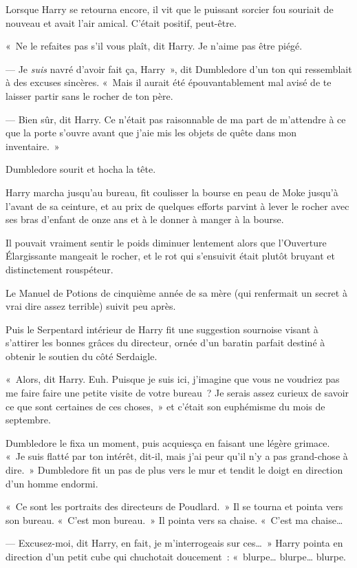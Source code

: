 Lorsque Harry se retourna encore, il vit que le puissant sorcier fou souriait de nouveau et avait l'air amical.
C'était positif, peut-être.

«~Ne le refaites pas s'il vous plaît, dit Harry.
Je n'aime pas être piégé.

--- Je \emph{suis} navré d'avoir fait ça, Harry~», dit Dumbledore d'un ton qui ressemblait à des excuses sincères.
«~Mais il aurait été épouvantablement mal avisé de te laisser partir sans le rocher de ton père.

--- Bien sûr, dit Harry.
Ce n'était pas raisonnable de ma part de m'attendre à ce que la porte s'ouvre avant que j'aie mis les objets de quête dans mon inventaire.~»

Dumbledore sourit et hocha la tête.

Harry marcha jusqu'au bureau, fit coulisser la bourse en peau de Moke jusqu'à l'avant de sa ceinture, et au prix de quelques efforts parvint à lever le rocher avec ses bras d'enfant de onze ans et à le donner à manger à la bourse.

Il pouvait vraiment sentir le poids diminuer lentement alors que l'Ouverture Élargissante mangeait le rocher, et le rot qui s'ensuivit était plutôt bruyant et distinctement rouspéteur.

Le Manuel de Potions de cinquième année de sa mère (qui renfermait un secret à vrai dire assez terrible) suivit peu après.

Puis le Serpentard intérieur de Harry fit une suggestion sournoise visant à s'attirer les bonnes grâces du directeur, ornée d'un baratin parfait destiné à obtenir le soutien du côté Serdaigle.

«~Alors, dit Harry.
Euh. Puisque je suis ici, j'imagine que vous ne voudriez pas me faire faire une petite visite de votre bureau~?
Je serais assez curieux de savoir ce que sont certaines de ces choses,~» et c'était son euphémisme du mois de septembre.

Dumbledore le fixa un moment, puis acquiesça en faisant une légère grimace.
«~Je suis flatté par ton intérêt, dit-il, mais j'ai peur qu'il n'y a pas grand-chose à dire.~»
Dumbledore fit un pas de plus vers le mur et tendit le doigt en direction d'un homme endormi.

«~Ce sont les portraits des directeurs de Poudlard.~»
Il se tourna et pointa vers son bureau.
«~C'est mon bureau.~»
Il pointa vers sa chaise.
«~C'est ma chaise…

--- Excusez-moi, dit Harry, en fait, je m'interrogeais sur ces…~»
Harry pointa en direction d'un petit cube qui chuchotait doucement~: «~blurpe… blurpe… blurpe.

